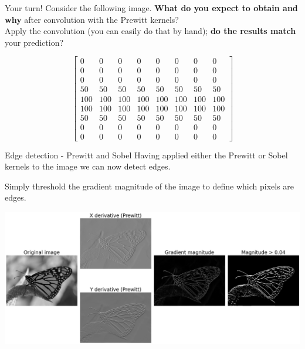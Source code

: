 \documentclass[9pt, aspectratio=169]{beamer}
\begin{document}
\begin{frame}
    {Your turn!}
    Consider the following image. \textbf{What do you expect to obtain and why} after convolution with the Prewitt kernels?\\
    Apply the convolution (you can easily do that by hand); \textbf{do the results match} your prediction?

    $$\begin{bmatrix}0   & 0   & 0   & 0   & 0   & 0   & 0   & 0   \\
            0   & 0   & 0   & 0   & 0   & 0   & 0   & 0   \\
            0   & 0   & 0   & 0   & 0   & 0   & 0   & 0   \\
            50  & 50  & 50  & 50  & 50  & 50  & 50  & 50  \\
            100 & 100 & 100 & 100 & 100 & 100 & 100 & 100 \\
            100 & 100 & 100 & 100 & 100 & 100 & 100 & 100 \\
            50  & 50  & 50  & 50  & 50  & 50  & 50  & 50  \\
            0   & 0   & 0   & 0   & 0   & 0   & 0   & 0   \\
            0   & 0   & 0   & 0   & 0   & 0   & 0   & 0
        \end{bmatrix}$$
\end{frame}

\begin{frame}
    {Edge detection - Prewitt and Sobel}
    Having applied either the Prewitt or Sobel kernels to the image we can now detect edges.

    Simply threshold the gradient magnitude of the image to define which pixels are edges.

    \centering
    \includegraphics[width=.9\textwidth]{monarch_prewitt.png}
\end{frame}
\end{document}
